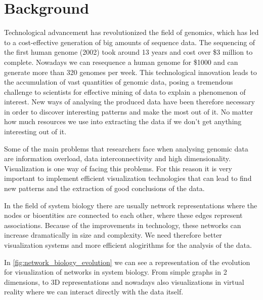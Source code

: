 \section{Background}
Technological advancement has revolutionized the field of genomics, which has led to a cost-effective generation of big amounts of sequence data. The sequencing of the first human genome (2002) took around 13 years and cost over \$3 million to complete. Nowadays we can resequence a human genome for \$1000 and can generate more than 320 genomes per week\cite{big_biological_impacts_bd}. This technological innovation leads to the accumulation of vast quantities of genomic data, posing a tremendous challenge to scientists for effective mining of data to explain a phenomenon of interest\cite{zhang_paciorkowski_craig_cui_2019}. New ways of analysing the produced data have been therefore necessary in order to discover interesting patterns  and make the most out of it. No matter how much resources we use into extracting the data if we don't get anything interesting out of it.

Some of the main problems that researchers face when analysing genomic data are information overload, data interconnectivity and high dimensionality. Visualization is one way of facing this problems. For this reason it is very important to implement efficient visualization technologies that can lead to find new patterns and the extraction of good conclusions of the data.

In the field of system biology there are usually network representations where the nodes or bioentities are connected to each other, where these edges represent associations. Because of the improvements in technology, these networks can increase dramatically in size and complexity. We need therefore better visualization systems and more efficient alogirithms for the analysis of the data.

In \ref{fig:network_biology_evolution} we can see a representation of the evolution for visualization of networks in system biology. From simple graphs in 2 dimensions, to 3D representations and nowadays also visualizations in virtual reality where we can interact directly with the data itself.

